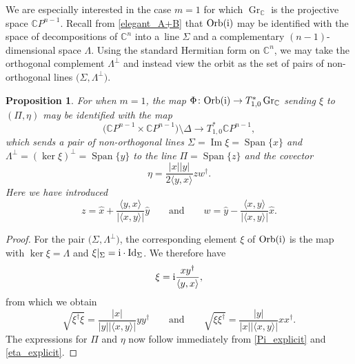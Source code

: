 \documentclass[pdftex]{sigma}
\numberwithin{equation}{section}
\newtheorem{Proposition}[Theorem]{Proposition}
 { \theoremstyle{definition}
\newtheorem{Definition}[Theorem]{Definition}
\newtheorem{Note}[Theorem]{Note}
\newtheorem{Example}[Theorem]{Example}
\newtheorem{Remark}[Theorem]{Remark} }
\DeclareMathOperator{\Span}{Span}
\DeclareMathOperator{\Imag}{Im}
\DeclareMathOperator{\Gr}{Gr}
\newcommand{\C}{\mathbb{C}}
\newcommand{\CP}{\mathbb{C}P}
\newcommand{\Id}{{\rm Id}}
\begin{document}
We are especially interested in the case $m=1$ for which $\Gr_\C$ is the projective space $\CP^{n-1}$. Recall from \eqref{elegant_A+B} that ${\rm Orb}({\rm i})$ may be identified with the space of decompositions of $\C^n$ into a~line $\Sigma$ and a complementary $(n-1)$-dimensional space $\Lambda$. Using the standard Hermitian form on $\C^n$, we may take the orthogonal complement $\Lambda^\perp$ and instead view the orbit as the set of pairs of non-orthogonal lines $\bigl(\Sigma,\Lambda^\perp\bigr)$.
\begin{Proposition}\label{Phi_for_CPn}
	For when $m=1$, the map $\Phi\colon {\rm Orb}({\rm i})\rightarrow T^*_{1,0}\Gr_\C$ sending $\xi$ to $(\Pi,\eta)$ may be identified with the map
	\[
	\bigl(\CP^{n-1}\times\CP^{n-1}\bigr)\setminus\Delta\longrightarrow T^*_{1,0}\CP^{n-1},
	\]
	which sends a pair of non-orthogonal lines $\Sigma=\Imag\xi=\Span\{x\}$ and $\Lambda^\perp=(\ker\xi)^\perp=\Span\{y\}$ to the line $\Pi=\Span\{z\}$ and the covector
	\begin{equation*}
		\eta=\frac{|x||y|}{2\langle y,x\rangle}zw^\dagger.
	\end{equation*}
	Here we have introduced
	\begin{equation}\label{z_w_defn}
		z=\hat{x}+\frac{\langle y, x\rangle}{|\langle x,y\rangle|}\hat{y}\qquad\text{and}\qquad w=\hat{y}-\frac{\langle x,y\rangle}{|\langle x,y\rangle|}\hat{x}.
	\end{equation}
\end{Proposition}
\begin{proof}
	For the pair $\bigl(\Sigma,\Lambda^\perp\bigr)$, the corresponding element $\xi$ of ${\rm Orb}({\rm i})$ is the map with $\ker\xi=\Lambda$ and $\xi|_\Sigma={\rm i}\cdot\Id_\Sigma$. We therefore have
	\begin{equation}\label{xi_as_xy}
		\xi={\rm i}\frac{xy^\dagger}{\langle y,x\rangle},
	\end{equation}
	from which we obtain
	\[
	\sqrt{\xi^\dagger\xi}=\frac{|x|}{|y||\langle x,y\rangle|}yy^\dagger\qquad\text{and}\qquad\sqrt{\xi\xi^\dagger}=\frac{|y|}{|x||\langle x, y\rangle|}xx^\dagger.
	\]
	The expressions for $\Pi$ and $\eta$ now follow immediately from \eqref{Pi_explicit} and \eqref{eta_explicit}.
\end{proof}
\end{document}
